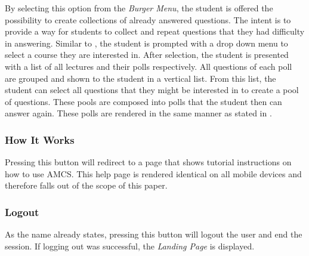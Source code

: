 By selecting this option from the \emph{Burger Menu}, the student is offered the possibility to create collections of already answered questions. The intent is to provide a way for students to collect and repeat questions that they had difficulty in answering.
Similar to \todosct, the student is prompted with a drop down menu to select a course they are interested in. After selection, the student is presented with a list of all lectures and their polls respectively. All questions of each poll are grouped and shown to the student in a vertical list. From this list, the student can select all questions that they might be interested in to create a pool of questions.
These pools are composed into polls that the student then can answer again. These polls are rendered in the same manner as stated in .


\subsubsection{How It Works}

Pressing this button will redirect to a page that shows tutorial instructions on how to use AMCS.
This help page is rendered identical on all mobile devices and therefore falls out of the scope of this paper.

\subsubsection{Logout}

As the name already states, pressing this button will logout the user and end the session. 
If logging out was successful, the \emph{Landing Page} is displayed.


